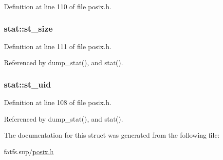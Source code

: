Definition at line 110 of file posix.\+h.

\subsubsection[{\texorpdfstring{st\+\_\+size}{st_size}}]{ stat\+::st\+\_\+size}\hypertarget{structstat_a040e19c8b9766f841fde8786ce9297bf}{}\label{structstat_a040e19c8b9766f841fde8786ce9297bf}


Definition at line 111 of file posix.\+h.



Referenced by dump\+\_\+stat(), and stat().

\subsubsection[{\texorpdfstring{st\+\_\+uid}{st_uid}}]{ stat\+::st\+\_\+uid}\hypertarget{structstat_a4a8708a3d18be60ee7b2f06c4cab0c70}{}\label{structstat_a4a8708a3d18be60ee7b2f06c4cab0c70}


Definition at line 108 of file posix.\+h.



Referenced by dump\+\_\+stat(), and stat().



The documentation for this struct was generated from the following file\+:\begin{DoxyCompactItemize}
\item 
fatfs.\+sup/\hyperlink{posix_8h}{posix.\+h}\end{DoxyCompactItemize}

